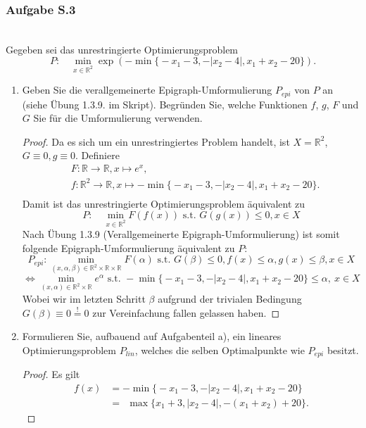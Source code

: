 \documentclass[12pt]{extreport} %
\newcommand{\R}{\mathbb{R}}
\theoremstyle{named}
\theoremstyle{nnamed}
\theoremstyle{itshape}
\theoremstyle{normal}
\begin{document}
\newpage

\subsubsection{Aufgabe S.3} ~\\
Gegeben sei das unrestringierte Optimierungsproblem
$$ P : \quad \min_{x \in \R^2} \exp \left(- \min \big\{- x_1 - 3, -\left|x_2 - 4\right|, x_1 + x_2 - 20 \big\} \right).$$
\begin{enumerate}
	\item Geben Sie die verallgemeinerte Epigraph-Umformulierung $P_{epi}$ von $P$ an (siehe Übung 1.3.9. im Skript). Begründen Sie, welche Funktionen $f$, $g$, $F$ und $G$ Sie für die Umformulierung verwenden.
		\begin{proof}
			Da es sich um ein unrestringiertes Problem handelt, ist $X = \R^2$, $G \equiv 0, g \equiv 0$. Definiere
			\begin{align*}
				& F: \R \rightarrow \R, x \mapsto e^{x}, \\
				& f: \R^2 \rightarrow \R, x \mapsto -\min\big\{- x_1 - 3, -\left|x_2 - 4\right|, x_1 + x_2 - 20\big\}. \\
			\end{align*}
			Damit ist das unrestringierte Optimierungsproblem äquivalent zu
			$$ P : \quad \min_{x \in \R^2} F(f(x)) \text{ s.t. } G(g(x)) \leq 0, x \in X $$
			Nach Übung 1.3.9 (Verallgemeinerte Epigraph-Umformulierung) ist somit folgende Epigraph-Umformulierung äquivalent zu $P$:
			$$ P_{epi}: \min_{(x, \alpha, \beta) \in \R^2 \times \R \times \R} F(\alpha) \text{ s.t. } G(\beta) \leq 0, f(x) \leq \alpha, g(x) \leq \beta, x \in X $$
			$$ \iff \min_{(x, \alpha) \in \R^2 \times \R} e^{\alpha} \text{ s.t. } -\min\big\{- x_1 - 3, -\left|x_2 - 4\right|, x_1 + x_2 - 20\big\} \leq \alpha, ~ x \in X $$
			Wobei wir im letzten Schritt $\beta$ aufgrund der trivialen Bedingung $G(\beta) \equiv 0 \overset{!}{=} 0$ zur Vereinfachung fallen gelassen haben.
		\end{proof}
	\item Formulieren Sie, aufbauend auf Aufgabenteil a), ein lineares Optimierungsproblem $P_{lin}$, welches die selben Optimalpunkte wie $P_{epi}$ besitzt.
		\begin{proof}
			Es gilt
			\begin{align*}
				f(x) & = -\min\big\{- x_1 - 3, -\left|x_2 - 4\right|, x_1 + x_2 - 20\big\} \\
				& = ~~ \max\big\{ x_1 + 3, \left|x_2 - 4\right|, -(x_1 + x_2) + 20\big\}.  

\end{align*}
\end{proof}
\end{enumerate}
\end{document}
